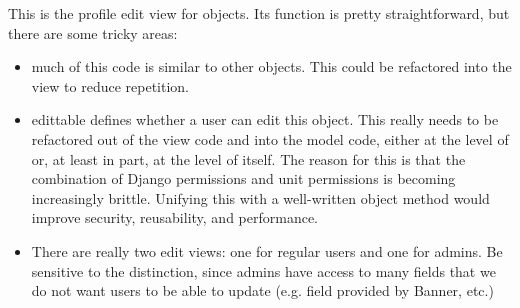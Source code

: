 \documentclass[letterpaper,10pt,english]{sphinxmanual}
\begin{document}

\begin{fulllineitems}
\label{generated/apps.profiles.views:apps.profiles.views.edit_staff_profile}
This is the profile edit view for  objects.  Its function is pretty
straightforward, but there are some tricky areas:
\begin{itemize}
\item {} 
much of this code is similar to other  objects.  This could be
refactored into the  view to reduce repetition.

\item {} 
edittable defines whether a user can edit this object.  This really needs
to be refactored out of the view code and into the model code, either
at the level of  or, at least in part, at the level of
 itself.  The reason for this is that the combination of 
Django permissions and unit permissions is becoming increasingly brittle.
Unifying this with a well-written object method would improve security,
reusability, and performance.

\item {} 
There are really two edit views: one for regular users and one for admins.
Be sensitive to the distinction, since admins have access to many fields
that we do not want users to be able to update (e.g. field provided by
Banner, etc.)

\end{itemize}

\end{fulllineitems}


\end{document}
